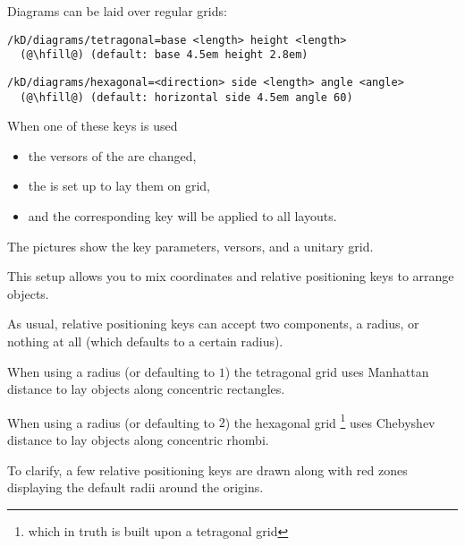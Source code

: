 \begin{marginfigure}[0cm]
\begin{subfigure}{\linewidth}
    \bigskip
  \end{subfigure}
\end{marginfigure}

Diagrams can be laid over regular grids:

\begin{lstlisting}
/kD/diagrams/tetragonal=base <length> height <length>
  (@\hfill@) (default: base 4.5em height 2.8em)
\end{lstlisting}

\begin{lstlisting}
/kD/diagrams/hexagonal=<direction> side <length> angle <angle>
  (@\hfill@) (default: horizontal side 4.5em angle 60)
\end{lstlisting}

When one of these keys is used
\begin{itemize}[noitemsep]
  \item the versors of the  are changed,
  \item the  is set up to lay them on grid,
  \item and the corresponding key will be applied to all layouts.
\end{itemize}

The pictures show the key parameters, versors, and a unitary grid.

This setup allows you to mix coordinates and
relative positioning keys to arrange objects.

As usual, relative positioning keys can accept two components, a radius,
or nothing at all (which defaults to a certain radius).

When using a radius (or defaulting to $1$)
the tetragonal grid uses Manhattan distance to
lay objects along concentric rectangles.

When using a radius (or defaulting to $2$)
the hexagonal grid%
\footnote{which in truth is built upon a tetragonal grid}
uses Chebyshev distance to
lay objects along concentric rhombi.

To clarify, a few relative positioning keys are drawn along
with red zones displaying the default radii around the origins.
